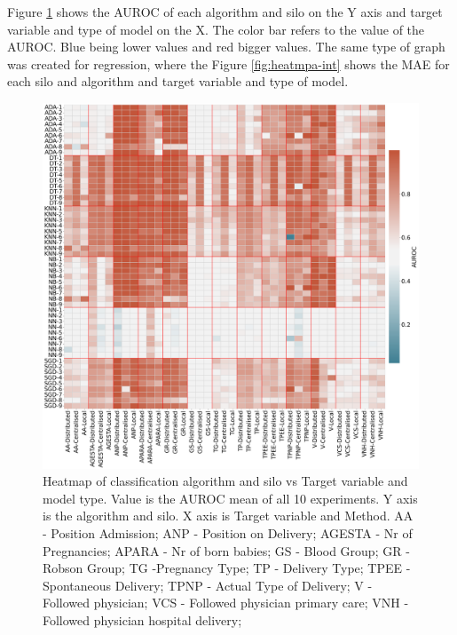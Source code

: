 





Figure \ref{fig:heatmap-cat} shows the AUROC of each algorithm and silo on the Y axis and target variable and type of model on the X. The color bar refers to the value of the AUROC. Blue being lower values and red bigger values. The same type of graph was created for regression, where the Figure \ref{fig:heatmpa-int} shows the MAE for each silo and algorithm and target variable and type of model. 



\begin{figure}[h!]
\centering
\captionsetup{justification=centering}

\caption[Heatmap of classification algorithm and silo vs Target variable and model type.]{Heatmap of classification algorithm and silo vs Target variable and model type. Value is the AUROC mean of all 10 experiments. Y axis is the algorithm and silo. X axis is Target variable and Method. AA - Position Admission; ANP - Position on Delivery; AGESTA - Nr of Pregnancies; APARA - Nr of born babies; GS - Blood Group; GR - Robson Group; TG -Pregnancy Type; TP - Delivery Type; TPEE - Spontaneous Delivery; TPNP - Actual Type of Delivery; V - Followed physician; VCS - Followed physician primary care; VNH - Followed physician hospital delivery;}\label{fig:heatmap-cat} 
\includegraphics[scale=0.22]{figures/heatmap-class.png}
\end{figure}


